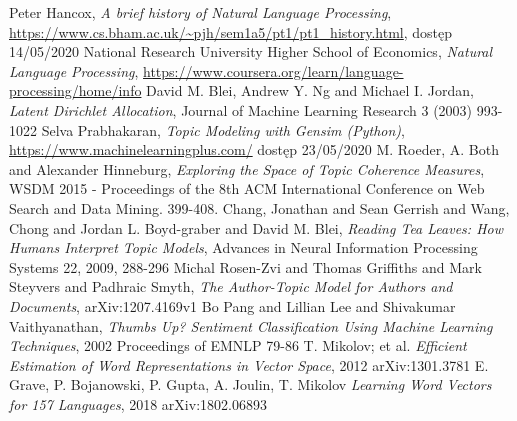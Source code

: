 \documentclass[a4paper,11pt,twoside]{report}
\theoremstyle{definition}
\begin{document}
\begin{thebibliography}{25}%
 Peter Hancox, \textit{A brief history of Natural Language Processing}, \url{https://www.cs.bham.ac.uk/~pjh/sem1a5/pt1/pt1_history.html}, dostęp 14/05/2020
 National Research University Higher School of Economics, \textit{Natural Language Processing}, \url{https://www.coursera.org/learn/language-processing/home/info}
 David M. Blei, Andrew Y. Ng and Michael I. Jordan, \textit{Latent Dirichlet Allocation}, Journal of Machine Learning Research 3 (2003) 993-1022
 Selva Prabhakaran, \textit{Topic Modeling with Gensim (Python)}, \url{https://www.machinelearningplus.com/} dostęp 23/05/2020
 M. Roeder, A. Both and Alexander Hinneburg, \textit{Exploring the Space of Topic Coherence Measures}, WSDM 2015 - Proceedings of the 8th ACM International Conference on Web Search and Data Mining. 399-408.
 Chang, Jonathan and Sean Gerrish and Wang, Chong and Jordan L. Boyd-graber and David M. Blei, \textit{Reading Tea Leaves: How Humans Interpret Topic Models}, Advances in Neural Information Processing Systems 22, 2009, 288-296
 Michal Rosen-Zvi and Thomas Griffiths and Mark Steyvers and Padhraic Smyth, \textit{The Author-Topic Model for Authors and Documents}, arXiv:1207.4169v1
 Bo Pang and Lillian Lee and Shivakumar Vaithyanathan, \textit{Thumbs Up? Sentiment Classification Using Machine Learning Techniques}, 2002 Proceedings of EMNLP 79-86
 T. Mikolov; et al. \textit{Efficient Estimation of Word Representations in Vector Space}, 2012	arXiv:1301.3781
 E. Grave, P. Bojanowski, P. Gupta, A. Joulin, T. Mikolov \textit{Learning Word Vectors for 157 Languages}, 2018 arXiv:1802.06893
\end{thebibliography}

\thispagestyle{empty}


\listoffigures
\thispagestyle{empty}


\renewcommand{\listtablename}{Spis tabel}
\listoftables
\thispagestyle{empty}




\thispagestyle{empty}
\end{document}
